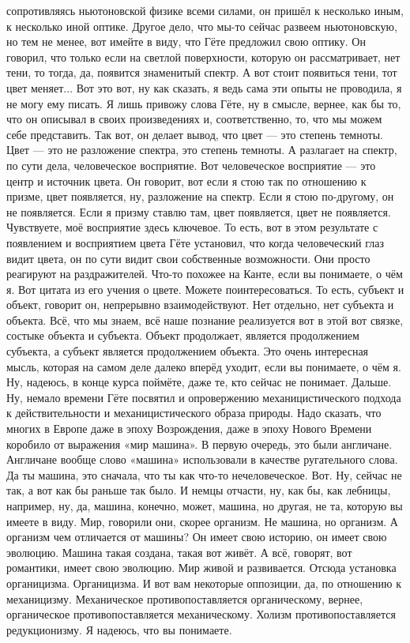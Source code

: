 сопротивляясь ньютоновской физике всеми силами, он пришёл к несколько иным, к
несколько иной оптике. Другое дело, что мы-то сейчас развеем ньютоновскую, но
тем не менее, вот имейте в виду, что Гёте предложил свою оптику. Он говорил, что
только если на светлой поверхности, которую он рассматривает, нет тени, то
тогда, да, появится знаменитый спектр. А вот стоит появиться тени, тот цвет
меняет... Вот это вот, ну как сказать, я ведь сама эти опыты не проводила, я не
могу ему писать. Я лишь привожу слова Гёте, ну в смысле, вернее, как бы то, что
он описывал в своих произведениях и, соответственно, то, что мы можем себе
представить. Так вот, он делает вывод, что цвет — это степень темноты. Цвет —
это не разложение спектра, это степень темноты. А разлагает на спектр, по сути
дела, человеческое восприятие. Вот человеческое восприятие — это центр и
источник цвета. Он говорит, вот если я стою так по отношению к призме, цвет
появляется, ну, разложение на спектр. Если я стою по-другому, он не появляется.
Если я призму ставлю там, цвет появляется, цвет не появляется. Чувствуете, моё
восприятие здесь ключевое. То есть, вот в этом результате с появлением и
восприятием цвета Гёте установил, что когда человеческий глаз видит цвета, он по
сути видит свои собственные возможности. Они просто реагируют на раздражителей.
Что-то похожее на Канте, если вы понимаете, о чём я. Вот цитата из его учения о
цвете. Можете поинтересоваться. То есть, субъект и объект, говорит он,
непрерывно взаимодействуют. Нет отдельно, нет субъекта и объекта. Всё, что мы
знаем, всё наше познание реализуется вот в этой вот связке, состыке объекта и
субъекта. Объект продолжает, является продолжением субъекта, а субъект является
продолжением объекта. Это очень интересная мысль, которая на самом деле далеко
вперёд уходит, если вы понимаете, о чём я. Ну, надеюсь, в конце курса поймёте,
даже те, кто сейчас не понимает. Дальше. Ну, немало времени Гёте посвятил и
опровержению механицистического подхода к действительности и механицистического
образа природы. Надо сказать, что многих в Европе даже в эпоху Возрождения, даже
в эпоху Нового Времени коробило от выражения «мир машина». В первую очередь, это
были англичане. Англичане вообще слово «машина» использовали в качестве
ругательного слова. Да ты машина, это сначала, что ты как что-то нечеловеческое.
Вот. Ну, сейчас не так, а вот как бы раньше так было. И немцы отчасти, ну, как
бы, как лебницы, например, ну, да, машина, конечно, может, машина, но другая, не
та, которую вы имеете в виду. Мир, говорили они, скорее организм. Не машина, но
организм. А организм чем отличается от машины? Он имеет свою историю, он имеет
свою эволюцию. Машина такая создана, такая вот живёт. А всё, говорят, вот
романтики, имеет свою эволюцию. Мир живой и развивается. Отсюда установка
органицизма. Органицизма. И вот вам некоторые оппозиции, да, по отношению к
механицизму. Механическое противопоставляется органическому, вернее,
органическое противопоставляется механическому. Холизм противопоставляется
редукционизму. Я надеюсь, что вы понимаете. 

